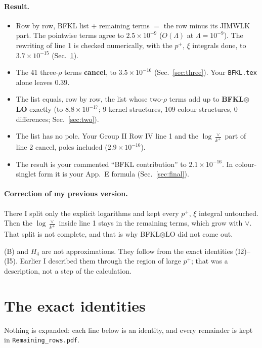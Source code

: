 \documentclass[10pt]{article}
\numberwithin{equation}{section}
\begin{document}
\paragraph{Result.}
\begin{itemize}
\item Row by row, BFKL list $+$ remaining terms $=$ the row minus its JIMWLK part. The pointwise terms agree to $2.5\times10^{-9}$ ($O(\Lambda)$ at $\Lambda=10^{-9}$). The rewriting of line 1 is checked numerically, with the $p^+$, $\xi$ integrals done, to $3.7\times10^{-15}$ (Sec.~\ref{sec:exact}).
\item The 41 three-$\rho$ terms \textbf{cancel}, to $3.5\times10^{-16}$ (Sec.~\ref{sec:three}). Your \texttt{BFKL.tex} alone leaves $0.39$.
\item The list equals, row by row, the list whose two-$\rho$ terms add up to \textbf{BFKL$\otimes$LO} exactly (to $8.8\times10^{-17}$; 9 kernel structures, 109 colour structures, 0 differences; Sec.~\ref{sec:two}).
\item The list has no pole. Your Group II Row IV line 1 and the $\log\frac{\vee}{k^+}$ part of line 2 cancel, poles included ($2.9\times10^{-16}$).
\item The result is your commented ``BFKL contribution'' to $2.1\times10^{-16}$. In colour-singlet form it is your App.~E formula (Sec.~\ref{sec:final}).
\end{itemize}

\paragraph{Correction of my previous version.} There I split only the explicit logarithms and kept every $p^+$, $\xi$ integral untouched. Then the $\log\frac{\vee}{k^+}$ inside line 1 stays in the remaining terms, which grow with $\vee$. That split is not complete, and that is why BFKL$\otimes$LO did not come out.

(B) and $H_4$ are not approximations. They follow from the exact identities (I2)--(I5). Earlier I described them through the region of large $p^+$; that was a description, not a step of the calculation.

\section{The exact identities}\label{sec:exact}
Nothing is expanded: each line below is an identity, and every remainder is kept in \texttt{Remaining\_rows.pdf}.
\end{document}
